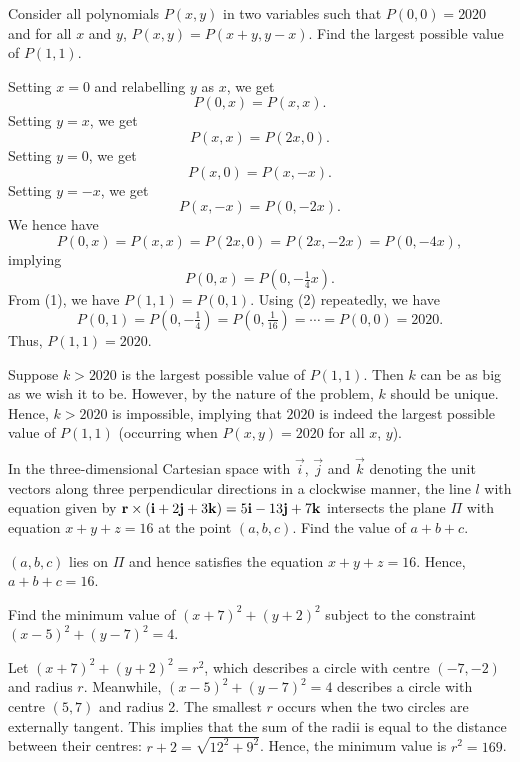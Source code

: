 \begin{question}[2020]\label{A::2021-O-1-6}
    Consider all polynomials $P(x, y)$ in two variables such that $P(0, 0) = 2020$ and for all $x$ and $y$, $P(x, y) = P(x + y, y - x)$. Find the largest possible value of $P(1, 1)$.
\end{question}
\begin{solution}
    Setting $x=0$ and relabelling $y$ as $x$, we get \[P(0, x) = P(x, x) \tag{1}.\] Setting $y = x$, we get \[P(x, x) = P(2x , 0).\] Setting $y = 0$, we get \[P(x, 0) = P(x, -x).\] Setting $y = -x$, we get \[P(x, -x) = P(0, -2x).\] We hence have \[P(0, x) = P(x, x) = P(2x, 0) = P(2x, -2x) = P(0, -4x),\] implying \[P(0, x) = P(0, -\tfrac14 x) \tag{2}.\] From (1), we have $P(1, 1) = P(0, 1)$. Using (2) repeatedly, we have \[P(0, 1) = P(0, -\tfrac14) = P(0, \tfrac1{16}) = \cdots = P(0, 0) = 2020.\] Thus, $P(1, 1) = 2020$.
\end{solution}
\begin{solution}
    Suppose $k > 2020$ is the largest possible value of $P(1, 1)$. Then $k$ can be as big as we wish it to be. However, by the nature of the problem, $k$ should be unique. Hence, $k > 2020$ is impossible, implying that $2020$ is indeed the largest possible value of $P(1, 1)$ (occurring when $P(x, y) = 2020$ for all $x$, $y$).
\end{solution}

\begin{question}[16]\label{A::2021-O-1-7}
    In the three-dimensional Cartesian space with $\vec i$, $\vec j$ and $\vec k$ denoting the unit vectors along three perpendicular directions in a clockwise manner, the line $l$ with equation given by $\mathbf{r} \times (\mathbf{i} + 2 \mathbf{j} + 3 \mathbf{k}) = 5\mathbf{i} - 13\mathbf{j} + 7\mathbf{k}$ intersects the plane $\Pi$ with equation $x + y + z = 16$ at the point $(a, b, c)$. Find the value of $a + b + c$.
\end{question}
\begin{solution*}
    $(a, b, c)$ lies on $\Pi$ and hence satisfies the equation $x + y + z = 16$. Hence, $a + b + c = 16$.
\end{solution*}

\begin{question}[169]\label{A::2021-O-1-8}
    Find the minimum value of $(x + 7)^2 + (y + 2)^2$ subject to the constraint $(x-5)^2 + (y-7)^2 = 4$.
\end{question}
\begin{solution*}
    Let $(x + 7)^2 + (y + 2)^2 = r^2$, which describes a circle with centre $(-7, -2)$ and radius $r$. Meanwhile, $(x-5)^2 + (y-7)^2 = 4$ describes a circle with centre $(5, 7)$ and radius 2. The smallest $r$ occurs when the two circles are externally tangent. This implies that the sum of the radii is equal to the distance between their centres: $r + 2 = \sqrt{12^2 + 9^2}$. Hence, the minimum value is $r^2 = 169$.
\end{solution*}

